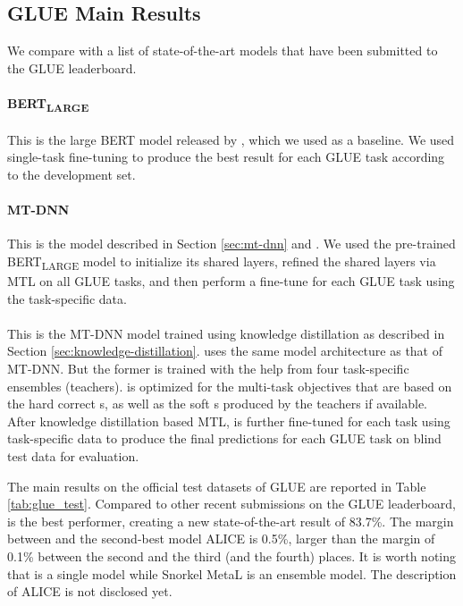 \subsection{GLUE Main Results}
\label{subsec:results}
We compare {\NMNAME} with a list of state-of-the-art models that have been submitted to the GLUE leaderboard. 

\paragraph{BERT\textsubscript{LARGE}} This is the large BERT model released by \citet{bert2018}, which we used as a baseline. We used single-task fine-tuning to produce the best result for each GLUE task according to the development set. 

\paragraph{MT-DNN} This is the model described in Section \ref{sec:mt-dnn} and \citet{liu2019mt-dnn}. We used the pre-trained BERT\textsubscript{LARGE} model to initialize its shared layers, refined the shared layers via MTL on all GLUE tasks,
and then perform a fine-tune for each GLUE task using the task-specific data.
\paragraph{{\NMNAME}} This is the MT-DNN model trained using knowledge distillation as described in Section \ref{sec:knowledge-distillation}. 
{\NMNAME} uses the same model architecture as that of MT-DNN. But the former is trained with the help from four task-specific ensembles (teachers). {\NMNAME} is optimized for the multi-task objectives that are based on the hard correct {\SLABEL}s, as well as the soft {\SLABEL}s produced by the teachers if available. 
After knowledge distillation based MTL, {\NMNAME} is further fine-tuned for each task using task-specific data to produce the final predictions for each GLUE task on blind test data for evaluation.








The main results on the official test datasets of GLUE are reported in Table \ref{tab:glue_test}. 
Compared to other recent submissions on the GLUE leaderboard, {\NMNAME} is the best performer,
creating a new state-of-the-art result of 83.7\%. 
The margin between {\NMNAME} and the second-best model ALICE is 0.5\%,  larger than the margin of 0.1\% between the second and the third (and the fourth) places. 
It is worth noting that {\NMNAME} is a single model while Snorkel MetaL \cite{hancock2019snorkel} is an ensemble model. The description of ALICE is not disclosed yet.

